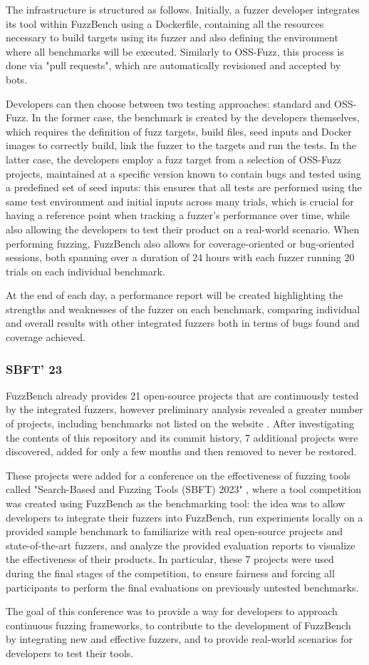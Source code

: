 The infrastructure is structured as follows.
Initially, a fuzzer developer integrates its tool within FuzzBench using a Dockerfile, containing all the resources necessary to build targets using its fuzzer and also defining the environment where all benchmarks will be executed. Similarly to OSS-Fuzz, this process is done via "pull requests", which are automatically revisioned and accepted by bots.

Developers can then choose between two testing approaches: standard and OSS-Fuzz. In the former case, the benchmark is created by the developers themselves, which requires the definition of fuzz targets, build files, seed inputs and Docker images to correctly build, link the fuzzer to the targets and run the tests. In the latter case, the developers employ a fuzz target from a selection of OSS-Fuzz projects, maintained at a specific version known to contain bugs \cite{benchmarks} and tested using a predefined set of seed inputs: this ensures that all tests are performed using the same test environment and initial inputs across many trials, which is crucial for having a reference point when tracking a fuzzer's performance over time, while also allowing the developers to test their product on a real-world scenario. When performing fuzzing, FuzzBench also allows for coverage-oriented or bug-oriented sessions, both spanning over a duration of 24 hours with each fuzzer running 20 trials on each individual benchmark.

At the end of each day, a performance report will be created highlighting the strengths and weaknesses of the fuzzer on each benchmark, comparing individual and overall results with other integrated fuzzers both in terms of bugs found and coverage achieved.



\subsubsection{SBFT' 23} \label{conference}
FuzzBench already provides 21 open-source projects that are continuously tested by the integrated fuzzers, however preliminary analysis revealed a greater number of projects, including benchmarks not listed on the website \cite{benchmarks}. After investigating the contents of this repository and its commit history, 7 additional projects were discovered, added for only a few months and then removed to never be restored.  

These projects were added for a conference on the effectiveness of fuzzing tools called "Search-Based and Fuzzing Tools (SBFT) 2023" \cite{sbft23}, where a tool competition was created using FuzzBench as the benchmarking tool: the idea was to allow developers to integrate their fuzzers into FuzzBench, run experiments locally on a provided sample benchmark to familiarize with real open-source projects and state-of-the-art fuzzers, and analyze the provided evaluation reports to visualize the effectiveness of their products. In particular, these 7 projects were used during the final stages of the competition, to ensure fairness and forcing all participants to perform the final evaluations on previously untested benchmarks.

The goal of this conference was to provide a way for developers to approach continuous fuzzing frameworks, to contribute to the development of FuzzBench by integrating new and effective fuzzers, and to provide real-world scenarios for developers to test their tools.